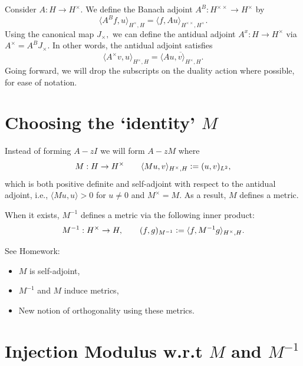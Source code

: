 \documentclass[12pt,a4paper]{article}
\newcommand{\defeq}{\vcentcolon=}
\theoremstyle{boldthm}
\theoremstyle{bolddefn}
\begin{document}
Consider $A : H \rightarrow H^{\times}.$ We define the Banach adjoint $A^B : H^{\times \times} \rightarrow H^{\times}$ by 
\begin{equation*}
    \langle A^B f, u \rangle_{H^{\times}, H} = \langle f , Au \rangle_{H^{\times \times}, H^{\times}}.
    \end{equation*}
Using the canonical map $J_{\times},$ we can define the antidual adjoint $A^x: H \rightarrow H^{\times}$ via $A^{\times} = A^B J_{\times}.$ In other words, the antidual adjoint satisfies 
\begin{equation}
    \langle A^{\times} v, u \rangle_{H^{\times}, H} = \overline{ \langle Au, v \rangle_{H^{\times}, H}}.
\end{equation}
Going forward, we will drop the subscripts on the duality action where possible, for ease of notation. 


\section{Choosing the `identity' $M$}

Instead of forming $A-zI$ we will form $A-zM$ where
\begin{equation}
    M : H \rightarrow H^{\times} \qquad \langle Mu, v \rangle_{H^{\times}, H} \defeq (u, v)_{L^2},
\end{equation}
which is both positive definite and self-adjoint with respect to the antidual adjoint, i.e., $\langle Mu, u \rangle > 0$ for $u \ne 0$ and $M^{\times} = M.$ As a result, $M$ defines a metric.


When it exists, $M^{-1}$ defines a metric via the following inner product:
\begin{equation}
    M^{-1}: H^{\times} \rightarrow H, \qquad (f, g)_{M^{-1}} \defeq \langle f, M^{-1} g \rangle_{H^{\times}, H}.
\end{equation}

See Homework:
\begin{itemize}
    \item $M$ is self-adjoint,
    \item $M^{-1}$ and $M$ induce metrics,
    \item New notion of orthogonality using these metrics. 
\end{itemize}


\section{Injection Modulus w.r.t $M$ and $M^{-1}$}
\end{document}

